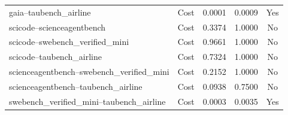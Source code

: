 \begin{tabular}{llrrc}
gaia--taubench\_airline & Cost & 0.0001 & 0.0009 & Yes \\
scicode--scienceagentbench & Cost & 0.3374 & 1.0000 & No \\
scicode--swebench\_verified\_mini & Cost & 0.9661 & 1.0000 & No \\
scicode--taubench\_airline & Cost & 0.7324 & 1.0000 & No \\
scienceagentbench--swebench\_verified\_mini & Cost & 0.2152 & 1.0000 & No \\
scienceagentbench--taubench\_airline & Cost & 0.0938 & 0.7500 & No \\
swebench\_verified\_mini--taubench\_airline & Cost & 0.0003 & 0.0035 & Yes \\
\bottomrule
\end{tabular}

